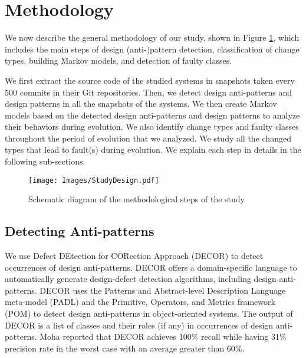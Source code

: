 \section{Methodology}
\label{sec:Methodology}

We now describe the general methodology of our study, shown in Figure \ref{fig:FigureMethod}, which includes the main steps of design (anti-)pattern detection, classification of change types, building Markov models, and detection of faulty classes.

We first extract the source code of the studied systems in snapshots taken every 500 commits in their Git repositories. Then, we detect design anti-patterns and design patterns in all the snapshots of the systems. We then create Markov models based on the detected design anti-patterns and design patterns to analyze their behaviors during evolution. We also identify change types and faulty classes throughout the period of evolution that we analyzed. We study all the changed types that lead to fault(s) during evolution. We explain each step in details in the following sub-sections.

\begin{figure}[ht]
\centering
\texttt{[image: Images/StudyDesign.pdf]}
\caption{Schematic diagram of the methodological steps of the study}
\label{fig:FigureMethod}
\end{figure}



\subsection{Detecting Anti-patterns}
\label{ssec:section3.1}

We use Defect DEtection for CORection Approach (DECOR) \cite{moha2010decor} to detect occurrences of design anti-patterns. DECOR offers a domain-specific language to automatically generate design-defect detection algorithms, including design anti-patterns. DECOR uses the Patterns and Abstract-level Description Language meta-model (PADL) \cite{gueheneuc2008demima} and the Primitive, Operators, and Metrics framework (POM) \cite{gueheneuc2004fingerprinting} to detect design anti-patterns in object-oriented systems. The output of DECOR is a list of classes and their roles (if any) in occurrences of design anti-patterns. Moha \etal \cite{moha2010decor} reported that DECOR achieves 100$\%$ recall while having 31$\%$ precision rate in the worst case with an average greater than 60$\%$.

